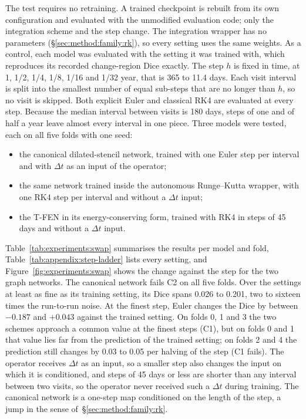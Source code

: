 The test requires no retraining. A trained checkpoint is rebuilt from its
own configuration and evaluated with the unmodified evaluation code; only
the integration scheme and the step change. The integration wrapper has no
parameters (\S\ref{sec:method:family:rk}), so every setting uses the same
weights. As a control, each model was evaluated with the setting it was
trained with, which reproduces its recorded change-region Dice exactly. The
step $h$ is fixed in time, at 1, 1/2, 1/4, 1/8, 1/16 and 1/32 year, that
is 365 to 11.4 days. Each visit interval is split into the smallest number
of equal sub-steps that are no longer than $h$, so no visit is skipped.
Both explicit Euler and classical RK4 are evaluated at every step. Because
the median interval between visits is 180 days, steps of one and of half a
year leave almost every interval in one piece. Three models were tested,
each on all five folds with one seed:
\begin{itemize}
  \item the canonical dilated-stencil network, trained with one Euler step
    per interval and with $\Delta t$ as an input of the operator;
  \item the same network trained inside the autonomous Runge--Kutta
    wrapper, with one RK4 step per interval and without a $\Delta t$ input;
  \item the T-FEN in its energy-conserving form, trained with RK4 in steps
    of 45 days and without a $\Delta t$ input.
\end{itemize}

Table~\ref{tab:experiments:swap} summarises the results per model and
fold, Table~\ref{tab:appendix:step-ladder} lists every setting, and
Figure~\ref{fig:experiments:swap} shows the change against the step for
the two graph networks. The
canonical network fails C2 on all five folds. Over the settings at least
as fine as its training setting, its Dice spans 0.026 to 0.201, two to
sixteen times the run-to-run noise. At the finest step, Euler changes the
Dice by between $-0.187$ and $+0.043$ against the trained setting. On
folds 0, 1 and 3 the two schemes approach a common value at the finest
steps (C1), but on folds 0 and 1 that value lies far from the prediction of
the trained setting; on folds 2 and 4 the prediction still changes by 0.03
to 0.05 per halving of the step (C1 fails). The operator receives
$\Delta t$ as an input, so a smaller step also changes the input on which
it is conditioned, and steps of 45 days or less are shorter than any
interval between two visits, so the operator never received such a
$\Delta t$ during training. The canonical network is a one-step map
conditioned on the length of the step, a jump in the sense
of~\S\ref{sec:method:family:rk}.

